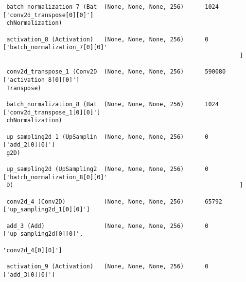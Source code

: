 \documentclass[
  letterpaper,
  DIV=11,
  numbers=noendperiod]{scrreprt}
\begin{document}
\begin{verbatim}
 batch_normalization_7 (Bat  (None, None, None, 256)      1024      ['conv2d_transpose[0][0]']    
 chNormalization)                                                                                 
                                                                                                  
 activation_8 (Activation)   (None, None, None, 256)      0         ['batch_normalization_7[0][0]'
                                                                    ]                             
                                                                                                  
 conv2d_transpose_1 (Conv2D  (None, None, None, 256)      590080    ['activation_8[0][0]']        
 Transpose)                                                                                       
                                                                                                  
 batch_normalization_8 (Bat  (None, None, None, 256)      1024      ['conv2d_transpose_1[0][0]']  
 chNormalization)                                                                                 
                                                                                                  
 up_sampling2d_1 (UpSamplin  (None, None, None, 256)      0         ['add_2[0][0]']               
 g2D)                                                                                             
                                                                                                  
 up_sampling2d (UpSampling2  (None, None, None, 256)      0         ['batch_normalization_8[0][0]'
 D)                                                                 ]                             
                                                                                                  
 conv2d_4 (Conv2D)           (None, None, None, 256)      65792     ['up_sampling2d_1[0][0]']     
                                                                                                  
 add_3 (Add)                 (None, None, None, 256)      0         ['up_sampling2d[0][0]',       
                                                                     'conv2d_4[0][0]']            
                                                                                                  
 activation_9 (Activation)   (None, None, None, 256)      0         ['add_3[0][0]']               
                                                                                                  

\end{verbatim}
\end{document}
